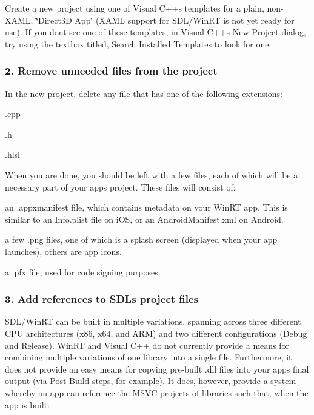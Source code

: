 Create a new project using one of Visual C++\textquotesingle{}s templates for a plain, non-\/\+X\+A\+ML, \char`\"{}\+Direct3\+D App\char`\"{} (X\+A\+ML support for S\+D\+L/\+Win\+RT is not yet ready for use). If you don\textquotesingle{}t see one of these templates, in Visual C++\textquotesingle{}s \textquotesingle{}New Project\textquotesingle{} dialog, try using the textbox titled, \textquotesingle{}Search Installed Templates\textquotesingle{} to look for one.

\subsubsection*{2. Remove unneeded files from the project}

In the new project, delete any file that has one of the following extensions\+:


\begin{DoxyItemize}
\item .cpp
\item .h
\item .hlsl
\end{DoxyItemize}

When you are done, you should be left with a few files, each of which will be a necessary part of your app\textquotesingle{}s project. These files will consist of\+:


\begin{DoxyItemize}
\item an .appxmanifest file, which contains metadata on your Win\+RT app. This is similar to an Info.\+plist file on i\+OS, or an Android\+Manifest.\+xml on Android.
\item a few .png files, one of which is a splash screen (displayed when your app launches), others are app icons.
\item a .pfx file, used for code signing purposes.
\end{DoxyItemize}

\subsubsection*{3. Add references to S\+DL\textquotesingle{}s project files}

S\+D\+L/\+Win\+RT can be built in multiple variations, spanning across three different C\+PU architectures (x86, x64, and A\+RM) and two different configurations (Debug and Release). Win\+RT and Visual C++ do not currently provide a means for combining multiple variations of one library into a single file. Furthermore, it does not provide an easy means for copying pre-\/built .dll files into your app\textquotesingle{}s final output (via Post-\/\+Build steps, for example). It does, however, provide a system whereby an app can reference the M\+S\+VC projects of libraries such that, when the app is built\+:


